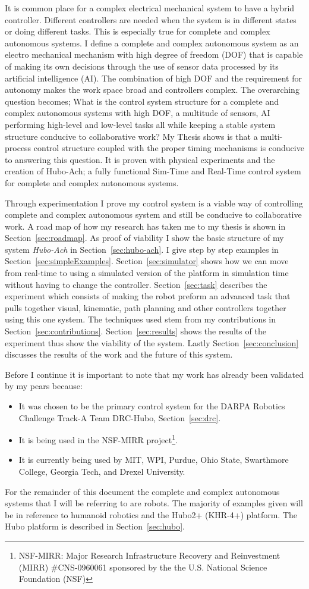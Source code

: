 
It is common place for a complex electrical mechanical system to have a hybrid controller.  
Different controllers are needed when the system is in different states or doing different tasks.
This is especially true for complete and complex autonomous systems.
I define a complete and complex autonomous system as an electro mechanical mechanism with high degree of freedom (DOF) that is capable of making its own decisions through the use of sensor data processed by its artificial intelligence (AI).
The combination of high DOF and the requirement for autonomy makes the work space broad and controllers complex.
The overarching question becomes; What is the control system structure for a complete and complex autonomous systems with high DOF, a multitude of sensors, AI performing high-level and low-level tasks all while keeping a stable system structure conducive to collaborative work?
My Thesis shows is that a multi-process control structure coupled with the proper timing mechanisms is conducive to answering this question.
It is proven with physical experiments and the creation of Hubo-Ach\cite{lofaroRAM2013}; a fully functional Sim-Time and Real-Time control system for complete and complex autonomous systems.

Through experimentation I prove my control system is a viable way of controlling complete and complex autonomous system and still be conducive to collaborative work.  
A road map of how my research has taken me to my thesis is shown in Section~\ref{sec:roadmap}.
As proof of viability I show the basic structure of my system \textit{Hubo-Ach} in Section~\ref{sec:hubo-ach}.  
I give step by step examples in Section~\ref{sec:simpleExamples}.
Section~\ref{sec:simulator} shows how we can move from real-time to using a simulated version of the platform in simulation time without having to change the controller.
Section~\ref{sec:task} describes the experiment which consists of making the robot preform an advanced task that pulls together visual, kinematic, path planning and other controllers together using this one system.
The techniques used stem from my contributions in Section~\ref{sec:contributions}.
Section~\ref{sec:results} shows the results of the experiment thus show the viability of the system.
Lastly Section~\ref{sec:conclusion} discusses the results of the work and the future of this system.

Before I continue it is important to note that my work has already been validated by my pears because:
\begin{itemize}
\item It was chosen to be the primary control system for the DARPA Robotics Challenge Track-A Team DRC-Hubo, Section~\ref{sec:drc}.
\item It is being used in the NSF-MIRR project\footnote{NSF-MIRR: Major Research Infrastructure Recovery and Reinvestment (MIRR) \#CNS-0960061 sponsored by the the U.S. National Science Foundation (NSF)}.
\item It is currently being used by MIT, WPI, Purdue, Ohio State, Swarthmore College, Georgia Tech, and Drexel University.
\end{itemize}

For the remainder of this document the complete and complex autonomous systems that I will be referring to are robots.
The majority of examples given will be in reference to humanoid robotics and the Hubo2+ (KHR-4+) platform.
The Hubo platform is described in Section~\ref{sec:hubo}.


